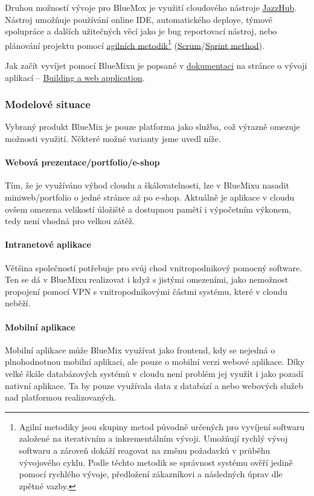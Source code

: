 Druhou možností vývoje pro BlueMox je využití cloudového nástroje \href{https://hub.jazz.net/}{JazzHub}. Nástroj umožňuje používání online IDE, automatického deploye, týmové spolupráce a dalších užitečných věcí jako je bug reportovací nástroj, nebo plánování projektu pomocí \href{http://cs.wikipedia.org/wiki/Agiln\%C3\%AD_metodiky}{agilních metodik}\footnote{Agilní metodiky jsou skupiny metod původně určených pro vyvíjení softwaru založené na iterativním a inkrementálním vývoji. Umožňují rychlý vývoj softwaru a zároveň dokáží reagovat na změnu požadavků v průběhu vývojového cyklu. Podle těchto metodik se správnost systému ověří jedině pomocí rychlého vývoje, předložení zákazníkovi a následných úprav dle zpětné vazby.\cite{wiki:agilniMetodiky}} (\href{http://en.wikipedia.org/wiki/Scrum_(software_development)}{Scrum\cite{wiki:scrum}}/\href{http://www.sprintmethod.cz/}{Sprint method}).

Jak začít vyvíjet pomocí BlueMixu je popsané v \href{https://www.ng.bluemix.net/docs}{dokumentaci\cite{bluemix:dokumentace}} na stránce o vývoji aplikací -- \href{https://www.ng.bluemix.net/docs/BuildingWeb.jsp}{Building a web application\cite{bluemix:buildingWeb}}.

\subsubsection{Modelové situace}
Vybraný produkt BlueMix je pouze platforma jako služba, což výrazně omezuje možnosti využití. Některé možné varianty jsme uvedl níže.

\paragraph{Webová prezentace/portfolio/e-shop}
Tím, že je využíváno výhod cloudu a škálovatelnosti, lze v BlueMixu nasadit miniweb/portfolio o jedné stránce až po e-shop. Aktuálně je aplikace v cloudu ovšem omezena velikostí úložiště a dostupnou pamětí i výpočetním výkonem, tedy není vhodná pro velkou zátěž.

\paragraph{Intranetové aplikace}
Většina společností potřebuje pro svůj chod vnitropodnikový pomocný software. Ten se dá v BlueMixu realizovat i když s jistými omezeními, jako nemožnost propojení pomocí VPN s vnitropodnikovými částmi systému, které v cloudu neběží.

\paragraph{Mobilní aplikace}
Mobilní aplikace může BlueMix využívat jako frontend, kdy se nejedná o plnohodnotnou mobilní aplikaci, ale pouze o mobilní verzi webové aplikace. Díky velké škále databázových systémů v cloudu není problém jej využít i jako pozadí nativní aplikace. Ta by pouze využívala data z databází a nebo webových služeb nad platformou realizovaných.

